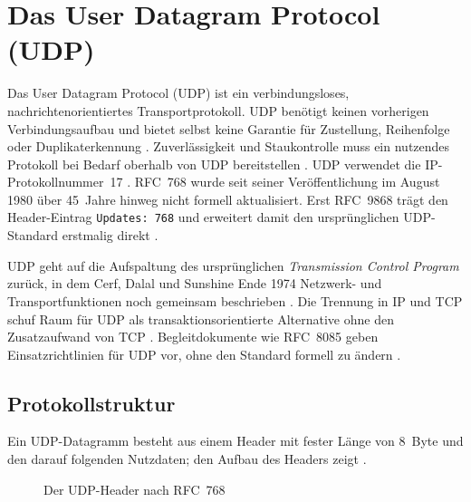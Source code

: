 \section{Das User Datagram Protocol (UDP)}
\label{sec:udp}

Das User Datagram Protocol (UDP) ist ein verbindungsloses, nachrichtenorientiertes Transportprotokoll.
UDP benötigt keinen vorherigen Verbindungsaufbau und bietet selbst keine Garantie für Zustellung, Reihenfolge oder
Duplikaterkennung \cite{rfc768}. Zuverlässigkeit und Staukontrolle muss ein nutzendes Protokoll bei Bedarf
oberhalb von UDP bereitstellen \cite[Sec.~3.1 bis 3.3]{rfc8085}. UDP verwendet die IP-Protokollnummer~17 \cite{rfc768}.
RFC~768 wurde seit seiner Veröffentlichung im August 1980 über 45~Jahre
hinweg nicht formell aktualisiert. Erst RFC~9868 trägt den Header-Eintrag
\texttt{Updates:~768} und erweitert damit den ursprünglichen UDP-Standard erstmalig direkt \cite{rfc9868}.

UDP geht auf die Aufspaltung des ursprünglichen \emph{Transmission Control Program} zurück, in dem
Cerf, Dalal und Sunshine Ende 1974 Netzwerk- und Transportfunktionen noch gemeinsam beschrieben
\cite{rfc675}. Die Trennung in IP und TCP schuf Raum für UDP als transaktionsorientierte Alternative ohne
den Zusatzaufwand von TCP \cite{rfc768}. Begleitdokumente wie RFC~8085 geben Einsatzrichtlinien für UDP vor,
ohne den Standard formell zu ändern \cite{rfc8085}.

\subsection{Protokollstruktur}
\label{subsec:udp-struktur}

Ein UDP-Datagramm besteht aus einem Header mit fester Länge von 8~Byte und den darauf folgenden Nutzdaten;
den Aufbau des Headers zeigt  \cite{rfc768}.

\begin{figure}[H]
  \centering
  \caption[Der UDP-Header nach RFC~768]{Der UDP-Header nach RFC~768 \cite{rfc768}}
  \label{fig:udp-header}
\end{figure}

